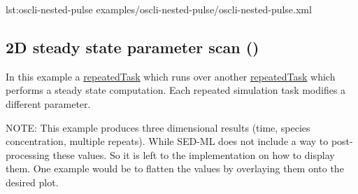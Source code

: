 {lst:oscli-nested-pulse}
{examples/oscli-nested-pulse/oscli-nested-pulse.xml}


\subsection{2D steady state parameter scan ()}
In this example a \hyperref[class:repeatedTask]{repeatedTask} which runs over another \hyperref[class:repeatedTask]{repeatedTask} which performs a steady state computation. Each repeated simulation task modifies a different parameter.

NOTE: This example produces three dimensional results (time, species concentration, multiple repeats). While SED-ML \currentLV does not include a way to post-processing these values. So it is left to the implementation on how to display them. One example would be to flatten the values by overlaying them onto the desired plot. 


